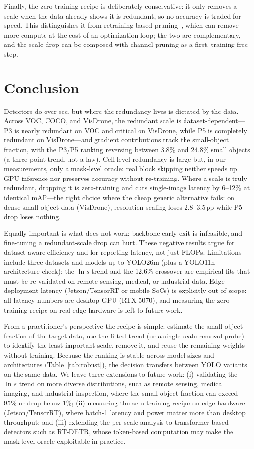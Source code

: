 \documentclass[a4paper,fleqn]{cas-dc}
\begin{document}
Finally, the zero-training recipe is deliberately conservative: it only removes a scale when the data already shows it is redundant, so no accuracy is traded for speed. This distinguishes it from retraining-based pruning~\cite{yan2023mccp,han2015pruning}, which can remove more compute at the cost of an optimization loop; the two are complementary, and the scale drop can be composed with channel pruning as a first, training-free step.

\section{Conclusion}
Detectors do over-see, but where the redundancy lives is dictated by the data. Across VOC, COCO, and VisDrone, the redundant scale is dataset-dependent---P3 is nearly redundant on VOC and critical on VisDrone, while P5 is completely redundant on VisDrone---and gradient contributions track the small-object fraction, with the P3/P5 ranking reversing between 3.8\% and 24.8\% small objects (a three-point trend, not a law). Cell-level redundancy is large but, in our measurements, only a mask-level oracle: real block skipping neither speeds up GPU inference nor preserves accuracy without re-training. Where a scale is truly redundant, dropping it is zero-training and cuts single-image latency by 6--12\% at identical mAP---the right choice where the cheap generic alternative fails: on dense small-object data (VisDrone), resolution scaling loses 2.8--3.5\,pp while P5-drop loses nothing.

Equally important is what does not work: backbone early exit is infeasible, and fine-tuning a redundant-scale drop can hurt. These negative results argue for dataset-aware efficiency and for reporting latency, not just FLOPs. Limitations include three datasets and models up to YOLO26m (plus a YOLO11n architecture check); the $\ln s$ trend and the 12.6\% crossover are empirical fits that must be re-validated on remote sensing, medical, or industrial data. Edge-deployment latency (Jetson/TensorRT or mobile SoCs) is explicitly out of scope: all latency numbers are desktop-GPU (RTX 5070), and measuring the zero-training recipe on real edge hardware is left to future work.

From a practitioner's perspective the recipe is simple: estimate the small-object fraction of the target data, use the fitted trend (or a single scale-removal probe) to identify the least important scale, remove it, and reuse the remaining weights without training. Because the ranking is stable across model sizes and architectures (Table~\ref{tab:robust}), the decision transfers between YOLO variants on the same data. We leave three extensions to future work: (i) validating the $\ln s$ trend on more diverse distributions, such as remote sensing, medical imaging, and industrial inspection, where the small-object fraction can exceed 95\% or drop below 1\%; (ii) measuring the zero-training recipe on edge hardware (Jetson/TensorRT), where batch-1 latency and power matter more than desktop throughput; and (iii) extending the per-scale analysis to transformer-based detectors such as RT-DETR, whose token-based computation may make the mask-level oracle exploitable in practice.
\end{document}
